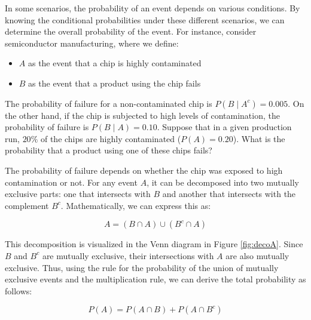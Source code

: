 In some scenarios, the probability of an event depends on various conditions. By knowing the conditional probabilities under these different scenarios, we can determine the overall probability of the event. For instance, consider semiconductor manufacturing, where we define:
\begin{itemize}
    \item \( A \) as the event that a chip is highly contaminated
    \item \( B \) as the event that a product using the chip fails
\end{itemize}
The probability of failure for a non-contaminated chip is \( P(B \mid A^c) = 0.005 \). On the other hand, if the chip is subjected to high levels of contamination, the probability of failure is \( P(B \mid A) = 0.10 \). Suppose that in a given production run, \( 20\% \) of the chips are highly contaminated (\( P(A) = 0.20 \)). What is the probability that a product using one of these chips fails?

The probability of failure depends on whether the chip was exposed to high contamination or not. For any event \( A \), it can be decomposed into two mutually exclusive parts: one that intersects with \( B \) and another that intersects with the complement \( B^c \). Mathematically, we can express this as:

\[
A = (B \cap A) \cup (B^c \cap A)
\]

This decomposition is visualized in the Venn diagram in Figure \ref{fig:decoA}. Since \( B \) and \( B^c \) are mutually exclusive, their intersections with \( A \) are also mutually exclusive. Thus, using the rule for the probability of the union of mutually exclusive events and the multiplication rule, we can derive the total probability as follows:

\[
P(A) = P(A \cap B) + P(A \cap B^c)
\]

\def\firstellipse{(3,1) ellipse (4.5cm and 2.2cm)} %




